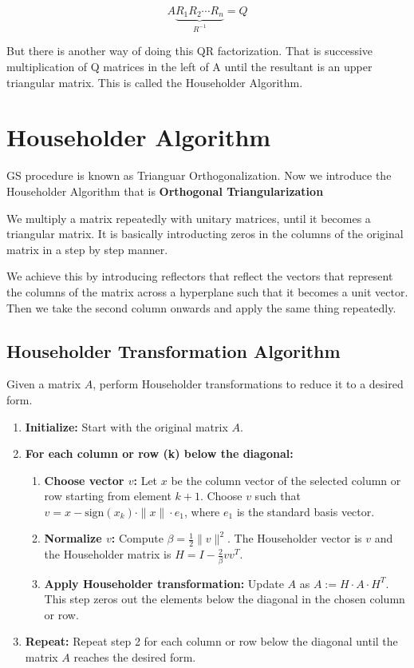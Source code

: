 $$A \underbrace{R_1 R_2 \cdots R_n}_{R^{-1}}=Q$$


But there is another way of doing this QR factorization. That is successive multiplication of Q matrices in the left of A until the resultant is an upper triangular matrix. This is called the Householder Algorithm.

\section{Householder Algorithm}

GS procedure is known as Trianguar Orthogonalization. Now we introduce the Householder Algorithm that is \textbf{Orthogonal Triangularization}

We multiply a matrix repeatedly with unitary matrices, until it becomes a triangular matrix. It is basically introducting zeros in the columns of the original matrix in a step by step manner. 

We achieve this by introducing reflectors that reflect the vectors that represent the columns of the matrix across a hyperplane such that it becomes a unit vector. Then we take the second column onwards and apply the same thing repeatedly. 

\subsection*{Householder Transformation Algorithm}

Given a matrix $A$, perform Householder transformations to reduce it to a desired form.

\begin{enumerate}
    \item \textbf{Initialize:} Start with the original matrix $A$.
    
    \item \textbf{For each column or row (k) below the diagonal:}
    \begin{enumerate}
        \item \textbf{Choose vector \(v\):} Let \(x\) be the column vector of the selected column or row starting from element \(k+1\). Choose \(v\) such that \(v = x - \text{sign}(x_k) \cdot \|x\| \cdot e_1\), where \(e_1\) is the standard basis vector.
        
        \item \textbf{Normalize \(v\):} Compute \(\beta = \frac{1}{2}\|v\|^2\). The Householder vector is \(v\) and the Householder matrix is \(H = I - \frac{2}{\beta}vv^T\).
        
        \item \textbf{Apply Householder transformation:} Update \(A\) as \(A := H \cdot A \cdot H^T\). This step zeros out the elements below the diagonal in the chosen column or row.
    \end{enumerate}
    
    \item \textbf{Repeat:} Repeat step 2 for each column or row below the diagonal until the matrix \(A\) reaches the desired form.
\end{enumerate}

